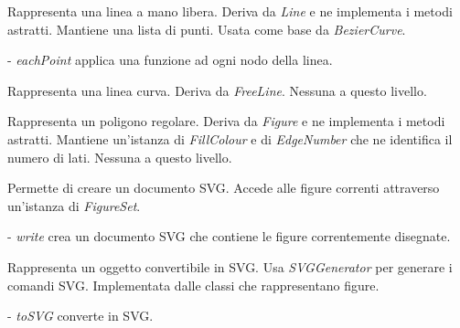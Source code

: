 Rappresenta una linea a mano libera.
Deriva da \textit{Line} e ne implementa i metodi astratti. Mantiene una lista di punti.
Usata come base da \textit{BezierCurve}.
\begin{elencopuntato}[\normindent]
\item[-] \textit{eachPoint} applica una funzione ad ogni nodo della linea.
\end{elencopuntato}

Rappresenta una linea curva.
Deriva da \textit{FreeLine}.
Nessuna a questo livello.

Rappresenta un poligono regolare.
Deriva da \textit{Figure} e ne implementa i metodi astratti. Mantiene un'istanza di \textit{FillColour} e di \textit{EdgeNumber} che ne identifica il numero di lati.
Nessuna a questo livello.

Permette di creare un documento SVG.
Accede alle figure correnti attraverso un'istanza di \textit{FigureSet}.
\begin{elencopuntato}[\normindent]
\item[-] \textit{write} crea un documento SVG che contiene le figure correntemente disegnate.
\end{elencopuntato}

Rappresenta un oggetto convertibile in SVG.
Usa \textit{SVGGenerator} per generare i comandi SVG.
Implementata dalle classi che rappresentano figure.
\begin{elencopuntato}[\normindent]
\item[-] \textit{toSVG} converte in SVG.
\end{elencopuntato}

